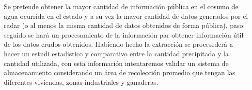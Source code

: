 \documentclass[letterpaper,12pt,oneside]{book}
\begin{document}
    Se pretende obtener la mayor cantidad de información pública en el cosumo de agua ocurrida en el estado y a su vez la mayor cantidad de datos generados por el radar (o al menos la misma cantidad de datos obtenidos de forma pública), paso seguido se hará un procesamiento de la información par obtener información útil de los datos crudos obtenidos. Habiendo hecho la extracción se procesederá a hacer un estudi estadistico y comparativo entre la cantidad precipitada y la cantidad utilizada, con esta información intentaremos validar un sistema de almacenamiento considerando un área de recolección promedio que tengan las diferentes viviendas, zonas industriales y ganaderas.

    
\nocite{*}



\backmatter%
\end{document}
